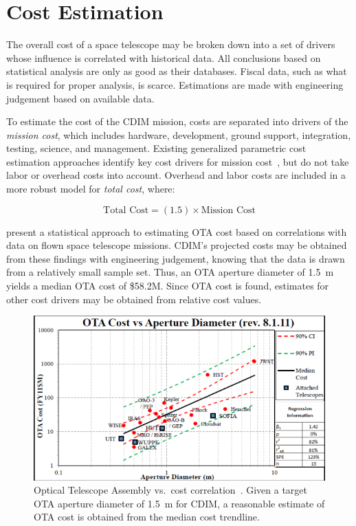 \documentclass{ws-jai}
\begin{document}
\section{Cost Estimation}
\label{sec:cost}
The overall cost of a space telescope may be broken down into a set of drivers whose influence is correlated with historical data.
All conclusions based on statistical analysis are only as good as their databases.
Fiscal data, such as what is required for proper analysis, is scarce.
Estimations are made with engineering judgement based on available data.

To estimate the cost of the CDIM mission, costs are separated into drivers of the \emph{mission cost}, which includes hardware, development, ground support, integration, testing, science, and management.
Existing generalized parametric cost estimation approaches identify key cost drivers for mission cost~\cite{stahl2013,bely2011}, but do not take labor or overhead costs into account.
Overhead and labor costs are included in a more robust model for \emph{total cost}, where:

\begin{equation}
  	\text{Total Cost}=(1.5)\times\text{Mission Cost}
\label{eq:total-cost}
\end{equation}

\citeauthor{stahl2013} present a statistical approach to estimating OTA cost based on correlations with data on flown space telescope missions.
CDIM's projected costs may be obtained from these findings with engineering judgement, knowing that the data is drawn from a relatively small sample set.
Thus, an OTA aperture diameter of \SI{1.5}{\meter} yields a median OTA cost of \$58.2M.
Since OTA cost is found, estimates for other cost drivers may be obtained from relative cost values.

\begin{figure}
    \centering
    \includegraphics[width=.6\linewidth]{figs/ota_cost-diameter_stahl2010.png}
    \caption{Optical Telescope Assembly vs.\ cost correlation~\cite{stahl2013}. Given a target OTA aperture diameter of \SI{1.5}{\meter} for CDIM, a reasonable estimate of OTA cost is obtained from the median cost trendline.
\label{fig:cost-stahl-ota-cost-vs-diameter}
}
\end{figure}
\end{document}
